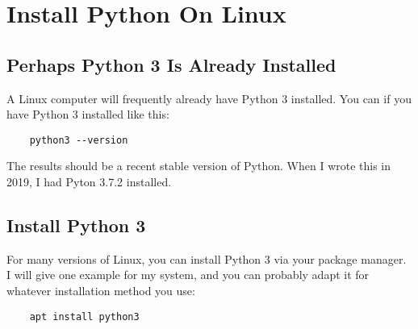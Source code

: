 \chapter{Install Python On Linux}
\hypertarget{linux-install-python}{}

\section{Perhaps Python 3 Is Already Installed}

A Linux computer will frequently already have Python 3 installed.
You can if you have Python 3 installed like this:

\begin{verbatim}
    python3 --version
\end{verbatim}

The results should be a recent stable version of Python. When I wrote
this in 2019, I had Pyton 3.7.2 installed.


\section{Install Python 3}

For many versions of Linux, you can install Python 3 via your package
manager. I will give one example for my system, and you can probably
adapt it for whatever installation method you use:

\begin{verbatim}
    apt install python3
\end{verbatim}

